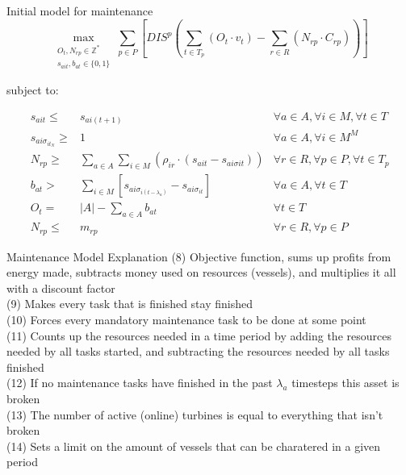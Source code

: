 \documentclass{beamer}
\begin{document}
\begin{frame}{Initial model for maintenance}
\footnotesize
\begin{equation}
	\max_{\substack{O_t, N_{rp} \in \mathbb{Z}^* \\ 
	s_{ait}, b_{at} \in \{0, 1\}}} 
	\sum_{p \in P} [ DIS^p (\sum_{t\in T_p} (O_t \cdot v_t)  - \sum_{r\in R} (N_{rp} \cdot C_{rp})) ]
\end{equation}

\bigskip

subject to:

\begin{align}
s_{ait} \leq& s_{ai(t+1)}													&	\forall a \in A, \forall i \in M, \forall t \in T	\\
s_{ai\sigma_{it_N}} \geq& 1												&	\forall a \in A, \forall i \in M^M			\\		
N_{rp} \geq& \sum_{a\in A} \sum_{i\in M} (\rho_{ir} \cdot (s_{ait} - s_{ai\sigma{it}})) 			& 	\forall r \in R, \forall p \in P, \forall t \in T_p 	\\
b_{at} >&  \sum_{i \in M} [s_{ai\sigma_{i(t - \lambda_a)}} - s_{ai\sigma_{it}}]					&	\forall a \in A, \forall t \in T 			\\
O_t =&  |A| - \sum_{a \in A} b_{at}											&	\forall t \in T 						\\
N_{rp} \leq& m_{rp}													&	 \forall r \in R, \forall p \in P
\end{align}

\end{frame}

\begin{frame}{Maintenance  Model Explanation}
(8) Objective function, sums up profits from energy made, subtracts money used on resources (vessels), and multiplies it all with a discount factor	\\
(9) Makes every task that is finished stay finished 	\\
(10) Forces every mandatory maintenance task to be done at some point	\\
(11) Counts up the resources needed in a time period by adding the resources needed by all tasks started, and subtracting the resources needed by all tasks finished	\\
(12) If no maintenance tasks have finished in the past $\lambda_a$ timesteps this asset is broken	\\
(13) The number of active (online) turbines is equal to everything that isn't broken \\
(14) Sets a limit on the amount of vessels that can be charatered in a given period
\end{frame}
\end{document}
